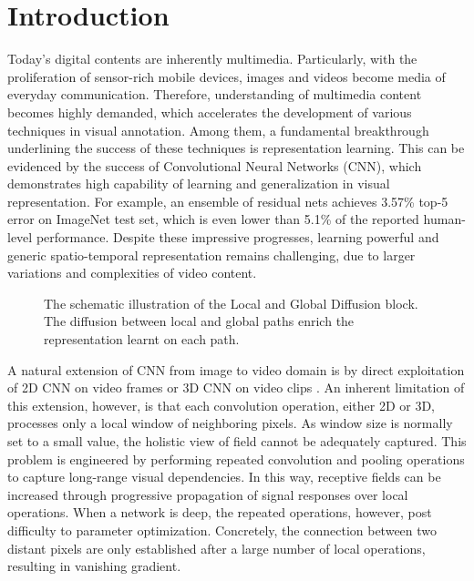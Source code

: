 \documentclass[10pt,twocolumn,letterpaper]{article}
\begin{document}
\section{Introduction}
Today's digital contents are inherently multimedia. Particularly, with the proliferation of sensor-rich mobile devices, images and videos become media of everyday communication. Therefore, understanding of multimedia content becomes highly demanded, which accelerates the development of various techniques in visual annotation. Among them, a fundamental breakthrough underlining the success of these techniques is representation learning. This can be evidenced by the success of Convolutional Neural Networks (CNN), which demonstrates high capability of learning and generalization in visual representation. For example, an ensemble of residual nets \cite{he2015deep} achieves 3.57\% top-5 error on ImageNet test set, which is even lower than 5.1\% of the reported human-level performance. Despite these impressive progresses, learning powerful and generic spatio-temporal representation remains challenging, due to larger variations and complexities of video content.

\begin{figure}[!tb]
   \caption{\small The schematic illustration of the Local and Global Diffusion block. The diffusion between local and global paths enrich the representation learnt on each path. }
   \label{fig:intro}
   \vspace{-0.25in}
\end{figure}

A natural extension of CNN from image to video domain is by direct exploitation of 2D CNN on video frames \cite{karpathy2014large,simonyan2014two,wang2016temporal} or 3D CNN on video clips \cite{ji20133d,qiu2017learning,qiu2018learning,tran2015learning}. An inherent limitation of this extension, however, is that each convolution operation, either 2D or 3D, processes only a local window of neighboring pixels. As window size is normally set to a small value, the holistic view of field cannot be adequately captured. This problem is engineered by performing repeated convolution and pooling operations to capture long-range visual dependencies. In this way, receptive fields can be increased through progressive propagation of signal responses over local operations. When a network is deep, the repeated operations, however, post difficulty to parameter optimization. Concretely, the connection between two distant pixels are only established after a large number of local operations, resulting in vanishing gradient.
\end{document}
